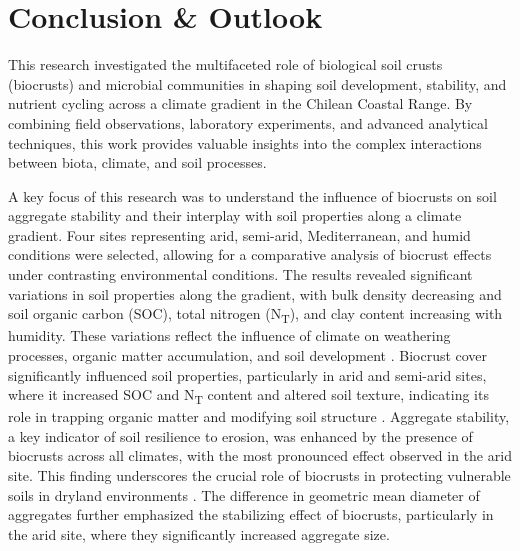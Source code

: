 \chapter{Conclusion \& Outlook}

This research investigated the multifaceted role of biological soil crusts (biocrusts) and microbial communities in shaping soil development, stability, and nutrient cycling across a climate gradient in the Chilean Coastal Range. By combining field observations, laboratory experiments, and advanced analytical techniques, this work provides valuable insights into the complex interactions between biota, climate, and soil processes.

A key focus of this research was to understand the influence of biocrusts on soil aggregate stability and their interplay with soil properties along a climate gradient. Four sites representing arid, semi-arid, Mediterranean, and humid conditions were selected, allowing for a comparative analysis of biocrust effects under contrasting environmental conditions. The results revealed significant variations in soil properties along the gradient, with bulk density decreasing and soil organic carbon (SOC), total nitrogen (N\textsubscript{T}), and clay content increasing with humidity. These variations reflect the influence of climate on weathering processes, organic matter accumulation, and soil development \citep{Jenny1941}. Biocrust cover significantly influenced soil properties, particularly in arid and semi-arid sites, where it increased SOC and N\textsubscript{T} content and altered soil texture, indicating its role in trapping organic matter and modifying soil structure \citep{Belnap2003,Bowker2006}. Aggregate stability, a key indicator of soil resilience to erosion, was enhanced by the presence of biocrusts across all climates, with the most pronounced effect observed in the arid site. This finding underscores the crucial role of biocrusts in protecting vulnerable soils in dryland environments \citep{Chamizo2012}. The difference in geometric mean diameter of aggregates further emphasized the stabilizing effect of biocrusts, particularly in the arid site, where they significantly increased aggregate size.

